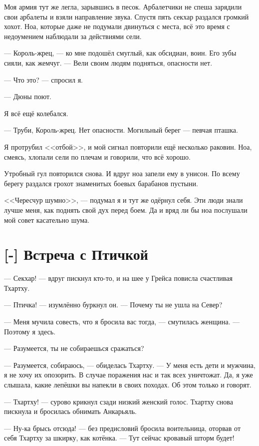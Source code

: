 Моя армия тут же легла, зарывшись в песок.
Арбалетчики не спеша зарядили свои арбалеты и взяли направление звука.
Спустя пять секхар раздался громкий хохот.
Ноа, которые даже не подумали двинуться с места, всё это время с недоумением наблюдали за действиями сели.

--- Король-жрец, --- ко мне подошёл смуглый, как обсидиан, воин.
Его зубы сияли, как жемчуг.
--- Вели своим людям подняться, опасности нет.

--- Что это? --- спросил я.

--- Дюны поют.

Я всё ещё колебался.

--- Труби, Король-жрец.
Нет опасности.
Могильный берег --- певчая пташка.

Я протрубил <<отбой>>, и мой сигнал повторили ещё несколько раковин.
Ноа, смеясь, хлопали сели по плечам и говорили, что всё хорошо.

Утробный гул повторился снова.
И вдруг ноа запели ему в унисон.
По всему берегу раздался грохот знаменитых боевых барабанов пустыни.

<<Чересчур шумно>>, --- подумал я и тут же одёрнул себя.
Эти люди знали лучше меня, как поднять свой дух перед боем.
Да и вряд ли бы ноа послушали мой совет касательно шума.

\section{[-] Встреча с Птичкой}

\textspace

--- Секхар! --- вдруг пискнул кто-то, и на шее у Грейса повисла счастливая Тхартху.

--- Птичка! --- изумлённо буркнул он.
--- Почему ты не ушла на Север?

--- Меня мучила совесть, что я бросила вас тогда, --- смутилась женщина.
--- Поэтому я здесь.

--- Разумеется, ты не собираешься сражаться?

--- Разумеется, собираюсь, --- обиделась Тхартху.
--- У меня есть дети и мужчина, я не хочу их опозорить.
В случае поражения нас и так всех уничтожат.
Да, я уже слышала, какие лепёшки вы напекли в своих походах.
Об этом только и говорят.

--- Тхартху! --- сурово крикнул сзади низкий женский голос.
Тхартху снова пискнула и бросилась обнимать Анкарьяль.

--- Ну-ка брысь отсюда! --- без предисловий бросила воительница, оторвав от себя Тхартху за шкирку, как котёнка.
--- Тут сейчас кровавый шторм будет!

